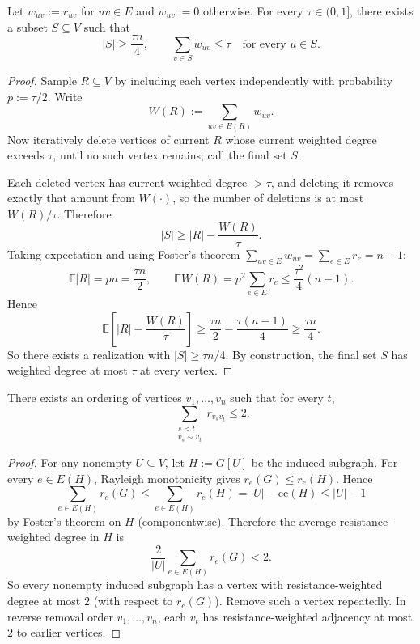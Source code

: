\begin{lemma}\label{lem:q6-rdeg}
Let $w_{uv}:=r_{uv}$ for $uv\in E$ and $w_{uv}:=0$ otherwise.
For every $\tau\in(0,1]$, there exists a subset $S\subseteq V$ such that
\[
|S|\ge \frac{\tau n}{4},
\qquad
\sum_{v\in S} w_{uv}\le \tau\quad\text{for every }u\in S.
\]
\end{lemma}

\begin{proof}
Sample $R\subseteq V$ by including each vertex independently with
probability $p:=\tau/2$.
Write
\[
W(R):=\sum_{uv\in E(R)} w_{uv}.
\]
Now iteratively delete vertices of current $R$ whose current weighted
degree exceeds $\tau$, until no such vertex remains; call the final set
$S$.

Each deleted vertex has current weighted degree $>\tau$, and deleting it
removes exactly that amount from $W(\cdot)$, so the number of deletions
is at most $W(R)/\tau$. Therefore
\[
|S|\ge |R|-\frac{W(R)}{\tau}.
\]
Taking expectation and using Foster's theorem
$\sum_{uv\in E}w_{uv}=\sum_{e\in E}r_e=n-1$:
\[
\mathbb E|R|=pn=\frac{\tau n}{2},\qquad
\mathbb E W(R)=p^2\sum_{e\in E}r_e
\le \frac{\tau^2}{4}(n-1).
\]
Hence
\[
\mathbb E\!\left[|R|-\frac{W(R)}{\tau}\right]
\ge
\frac{\tau n}{2}-\frac{\tau(n-1)}{4}
\ge \frac{\tau n}{4}.
\]
So there exists a realization with
$|S|\ge \tau n/4$.
By construction, the final set $S$ has weighted degree at most $\tau$ at
every vertex.
\end{proof}

\begin{lemma}\label{lem:q6-rdeg-order}
There exists an ordering of vertices
$v_1,\dots,v_n$ such that for every $t$,
\[
\sum_{\substack{s<t\\ v_s\sim v_t}} r_{v_s v_t}\le 2.
\]
\end{lemma}

\begin{proof}
For any nonempty $U\subseteq V$, let $H:=G[U]$ be the induced subgraph.
For every $e\in E(H)$, Rayleigh monotonicity gives
$r_e(G)\le r_e(H)$.
Hence
\[
\sum_{e\in E(H)} r_e(G)
\le
\sum_{e\in E(H)} r_e(H)
=|U|-\mathrm{cc}(H)\le |U|-1
\]
by Foster's theorem on $H$ (componentwise).
Therefore the average resistance-weighted degree in $H$ is
\[
\frac{2}{|U|}\sum_{e\in E(H)} r_e(G)<2.
\]
So every nonempty induced subgraph has a vertex with
resistance-weighted degree at most $2$ (with respect to $r_e(G)$).
Remove such a vertex repeatedly.
In reverse removal order $v_1,\dots,v_n$, each $v_t$ has
resistance-weighted adjacency at most $2$ to earlier vertices.
\end{proof}

